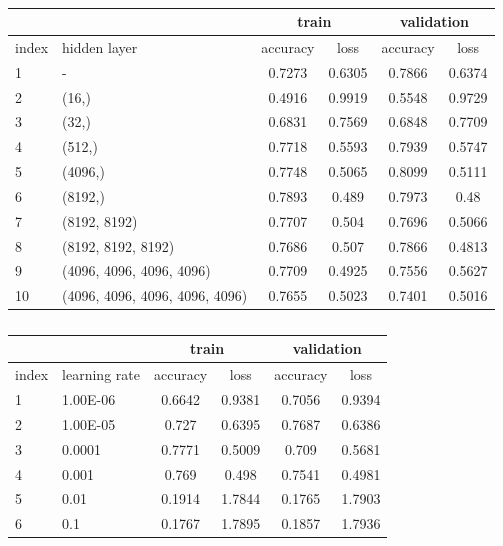 \documentclass[12pt, a4paper]{article}
\begin{document}
\begin{latin}
\begin{table}[!ht]
    \centering
    \caption{}
    \begin{tabular}{|l|l|c|c|c|c|}
    \hline
        & & \multicolumn{2}{c|}{train} & \multicolumn{2}{c|}{validation}  \\ \hline
        index & hidden layer & accuracy & loss & accuracy & loss \\ \hline
        1 & - & 0.7273 & 0.6305 & 0.7866 & 0.6374 \\ \hline
        2 & (16,) & 0.4916 & 0.9919 & 0.5548 & 0.9729 \\ \hline
        3 & (32,) & 0.6831 & 0.7569 & 0.6848 & 0.7709 \\ \hline
        4 & (512,) & 0.7718 & 0.5593 & 0.7939 & 0.5747 \\ \hline
        5 & (4096,) & 0.7748 & 0.5065 & 0.8099 & 0.5111 \\ \hline
        6 & (8192,) & 0.7893 & 0.489 & 0.7973 & 0.48 \\ \hline
        7 & (8192, 8192) & 0.7707 & 0.504 & 0.7696 & 0.5066 \\ \hline
        8 & (8192, 8192, 8192) & 0.7686 & 0.507 & 0.7866 & 0.4813 \\ \hline
        9 & (4096, 4096, 4096, 4096) & 0.7709 & 0.4925 & 0.7556 & 0.5627 \\ \hline
        10 & (4096, 4096, 4096, 4096, 4096) & 0.7655 & 0.5023 & 0.7401 & 0.5016 \\ \hline
    \end{tabular}
\end{table}
\end{latin}

\begin{latin}
\begin{table}[!ht]
    \centering
    \caption{}
    \begin{tabular}{|l|l|c|c|c|c|}
    \hline
        & & \multicolumn{2}{c|}{train} & \multicolumn{2}{c|}{validation}  \\ \hline
        index & learning rate & accuracy & loss & accuracy & loss \\ \hline
        1 & 1.00E-06 & 0.6642 & 0.9381 & 0.7056 & 0.9394 \\ \hline
        2 & 1.00E-05 & 0.727 & 0.6395 & 0.7687 & 0.6386 \\ \hline
        3 & 0.0001 & 0.7771 & 0.5009 & 0.709 & 0.5681 \\ \hline
        4 & 0.001 & 0.769 & 0.498 & 0.7541 & 0.4981 \\ \hline
        5 & 0.01 & 0.1914 & 1.7844 & 0.1765 & 1.7903 \\ \hline
        6 & 0.1 & 0.1767 & 1.7895 & 0.1857 & 1.7936 \\ \hline
    \end{tabular}
\end{table}
\end{latin}
\end{document}

